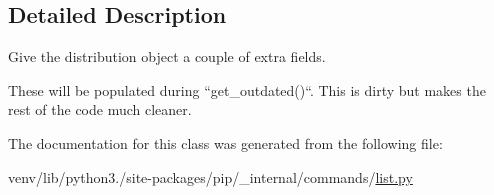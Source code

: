 \subsection{Detailed Description}
\begin{DoxyVerb}Give the distribution object a couple of extra fields.

These will be populated during ``get_outdated()``. This is dirty but
makes the rest of the code much cleaner.
\end{DoxyVerb}
 

The documentation for this class was generated from the following file\+:\begin{DoxyCompactItemize}
\item 
venv/lib/python3./site-\/packages/pip/\+\_\+internal/commands/\hyperlink{list_8py}{list.\+py}\end{DoxyCompactItemize}
